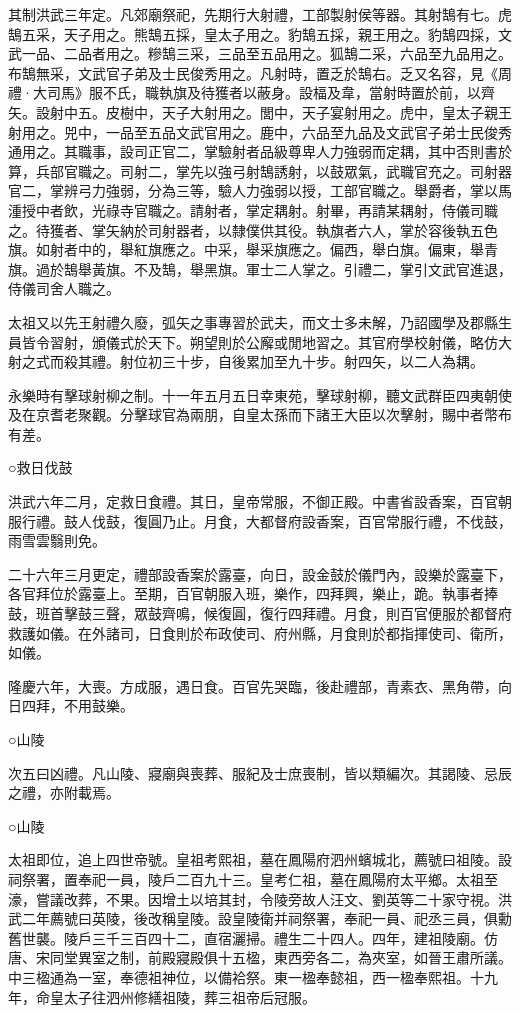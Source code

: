 其制洪武三年定。凡郊廟祭祀，先期行大射禮，工部製射侯等器。其射鵠有七。虎鵠五采，天子用之。熊鵠五採，皇太子用之。豹鵠五採，親王用之。豹鵠四採，文武一品、二品者用之。糝鵠三采，三品至五品用之。狐鵠二采，六品至九品用之。布鵠無采，文武官子弟及士民俊秀用之。凡射時，置乏於鵠右。乏又名容，見《周禮·大司馬》服不氏，職執旗及待獲者以蔽身。設楅及韋，當射時置於前，以齊矢。設射中五。皮樹中，天子大射用之。閭中，天子宴射用之。虎中，皇太子親王射用之。兕中，一品至五品文武官用之。鹿中，六品至九品及文武官子弟士民俊秀通用之。其職事，設司正官二，掌驗射者品級尊卑人力強弱而定耦，其中否則書於算，兵部官職之。司射二，掌先以強弓射鵠誘射，以鼓眾氣，武職官充之。司射器官二，掌辨弓力強弱，分為三等，驗人力強弱以授，工部官職之。舉爵者，掌以馬湩授中者飲，光祿寺官職之。請射者，掌定耦射。射畢，再請某耦射，侍儀司職之。待獲者、掌矢納於司射器者，以隸僕供其役。執旗者六人，掌於容後執五色旗。如射者中的，舉紅旗應之。中采，舉采旗應之。偏西，舉白旗。偏東，舉青旗。過於鵠舉黃旗。不及鵠，舉黑旗。軍士二人掌之。引禮二，掌引文武官進退，侍儀司舍人職之。

太祖又以先王射禮久廢，弧矢之事專習於武夫，而文士多未解，乃詔國學及郡縣生員皆令習射，頒儀式於天下。朔望則於公廨或閒地習之。其官府學校射儀，略仿大射之式而殺其禮。射位初三十步，自後累加至九十步。射四矢，以二人為耦。

永樂時有擊球射柳之制。十一年五月五日幸東苑，擊球射柳，聽文武群臣四夷朝使及在京耆老聚觀。分擊球官為兩朋，自皇太孫而下諸王大臣以次擊射，賜中者幣布有差。

○救日伐鼓

洪武六年二月，定救日食禮。其日，皇帝常服，不御正殿。中書省設香案，百官朝服行禮。鼓人伐鼓，復圓乃止。月食，大都督府設香案，百官常服行禮，不伐鼓，雨雪雲翳則免。

二十六年三月更定，禮部設香案於露臺，向日，設金鼓於儀門內，設樂於露臺下，各官拜位於露臺上。至期，百官朝服入班，樂作，四拜興，樂止，跪。執事者捧鼓，班首擊鼓三聲，眾鼓齊鳴，候復圓，復行四拜禮。月食，則百官便服於都督府救護如儀。在外諸司，日食則於布政使司、府州縣，月食則於都指揮使司、衛所，如儀。

隆慶六年，大喪。方成服，遇日食。百官先哭臨，後赴禮部，青素衣、黑角帶，向日四拜，不用鼓樂。


○山陵

次五曰凶禮。凡山陵、寢廟與喪葬、服紀及士庶喪制，皆以類編次。其謁陵、忌辰之禮，亦附載焉。

○山陵

太祖即位，追上四世帝號。皇祖考熙祖，墓在鳳陽府泗州蠙城北，薦號曰祖陵。設祠祭署，置奉祀一員，陵戶二百九十三。皇考仁祖，墓在鳳陽府太平鄉。太祖至濠，嘗議改葬，不果。因增土以培其封，令陵旁故人汪文、劉英等二十家守視。洪武二年薦號曰英陵，後改稱皇陵。設皇陵衛并祠祭署，奉祀一員、祀丞三員，俱勳舊世襲。陵戶三千三百四十二，直宿灑掃。禮生二十四人。四年，建祖陵廟。仿唐、宋同堂異室之制，前殿寢殿俱十五楹，東西旁各二，為夾室，如晉王肅所議。中三楹通為一室，奉德祖神位，以備袷祭。東一楹奉懿祖，西一楹奉熙祖。十九年，命皇太子往泗州修繕祖陵，葬三祖帝后冠服。

